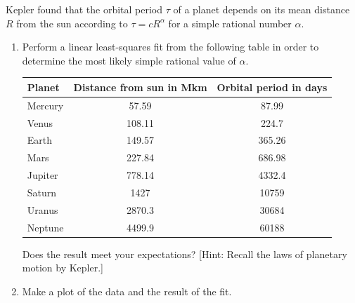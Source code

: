 \begin{exercise}
    Kepler found that the orbital period $\tau$ of a planet depends on its mean distance $R$ from the sun according to $\tau=c R^{\alpha}$ for a simple rational number $\alpha$. 
    \begin{enumerate}[label=(\alph*)]
        \item Perform a linear least-squares fit from the following table in order to determine the most likely simple rational value of $\alpha$.

        \begin{center}
          \begin{tabular}{|l|c|c|}
          \hline
              \textbf{Planet}  & \textbf{Distance from sun in Mkm} &  \textbf{Orbital period in days} \\
              \hline
              Mercury & 57.59                                      & 87.99  \\
              Venus   & 108.11                                     & 224.7  \\
              Earth   & 149.57                                     & 365.26 \\
              Mars    & 227.84                                     & 686.98 \\
              Jupiter & 778.14                                     & 4332.4 \\
              Saturn  & 1427                                       & 10759   \\
              Uranus  & 2870.3                                     & 30684   \\
              Neptune & 4499.9                                     & 60188   \\
          \hline
          \end{tabular}
        \end{center}

        Does the result meet your expectations? [Hint: Recall the laws of planetary motion by Kepler.]

        \item Make a plot of the data and the result of the fit.
    \end{enumerate}
\end{exercise}

